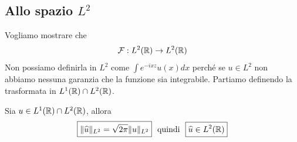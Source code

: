 \subsection{Allo spazio $L^{2}$}

Vogliamo mostrare che
\begin{equation*}
\mathcal{F} : L^{2}(\mathbb{R})\rightarrow L^{2}(\mathbb{R})
\end{equation*}
Non possiamo definirla in $L^{2}$ come $\int e^{- ixz} u(x) dx$ perché se $u\in L^{2}$ non abbiamo nessuna garanzia che la funzione sia integrabile. Partiamo definendo la trasformata in $L^{1}(\mathbb{R}) \cap L^{2}(\mathbb{R})$.
\begin{thm}
[di Plancherel]
Sia $u\in L^{1}(\mathbb{R}) \cap L^{2}(\mathbb{R})$, allora
\begin{equation*}
\boxed{\Vert \hat{u} \Vert_{L^{2}} = \sqrt{2\pi} \Vert u \Vert_{L^{2}}} \ \ \text{quindi} \ \ \boxed{\hat{u} \in L^{2}(\RR)}
\end{equation*}
\end{thm}
